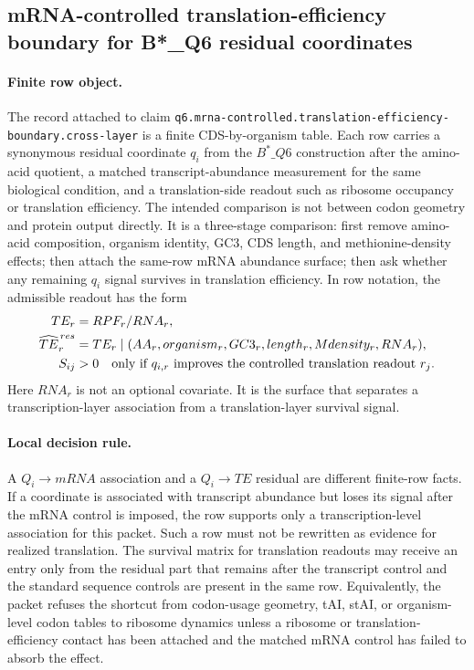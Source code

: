\subsection{mRNA-controlled translation-efficiency boundary for B*\_Q6 residual coordinates}\label{sec:bior-q6-mrna-controlled-translation-efficiency-boundary}

\paragraph{Finite row object.} The record attached to claim \texttt{q6.mrna-controlled.translation-efficiency-boundary.cross-layer} is a finite CDS-by-organism table.  Each row carries a synonymous residual coordinate $q_i$ from the $B^*\_{Q6}$ construction after the amino-acid quotient, a matched transcript-abundance measurement for the same biological condition, and a translation-side readout such as ribosome occupancy or translation efficiency.  The intended comparison is not between codon geometry and protein output directly.  It is a three-stage comparison: first remove amino-acid composition, organism identity, GC3, CDS length, and methionine-density effects; then attach the same-row mRNA abundance surface; then ask whether any remaining $q_i$ signal survives in translation efficiency.  In row notation, the admissible readout has the form
$$
\begin{aligned}
TE_r &= RPF_r / RNA_r,\\
\widehat{TE}^{\,res}_r &= TE_r \mid (AA_r, organism_r, GC3_r, length_r, Mdensity_r, RNA_r),\\
S_{ij} &> 0 \quad \hbox{only if } q_{i,r} \hbox{ improves the controlled translation readout } r_j.
\end{aligned}
$$
Here $RNA_r$ is not an optional covariate.  It is the surface that separates a transcription-layer association from a translation-layer survival signal.

\paragraph{Local decision rule.} A $Q_i \to mRNA$ association and a $Q_i \to TE$ residual are different finite-row facts.  If a coordinate is associated with transcript abundance but loses its signal after the mRNA control is imposed, the row supports only a transcription-level association for this packet.  Such a row must not be rewritten as evidence for realized translation.  The survival matrix for translation readouts may receive an entry only from the residual part that remains after the transcript control and the standard sequence controls are present in the same row.  Equivalently, the packet refuses the shortcut from codon-usage geometry, tAI, stAI, or organism-level codon tables to ribosome dynamics unless a ribosome or translation-efficiency contact has been attached and the matched mRNA control has failed to absorb the effect.

